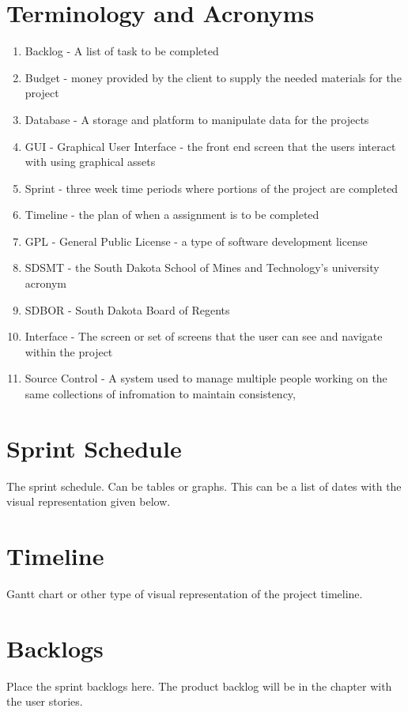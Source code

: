 \section{Terminology and Acronyms}
\begin{enumerate}
\item Backlog - A list of task to be completed
\item Budget - money provided by the client to supply the needed materials for the project
\item Database - A storage and platform to manipulate data for the projects 
\item GUI - Graphical User Interface - the front end screen that the users interact with using graphical assets
\item Sprint - three week time periods where portions of the project are completed
\item Timeline - the plan of when a assignment is to be completed
\item GPL - General Public License - a type of software development license
\item SDSMT - the South Dakota School of Mines and Technology's university acronym
\item SDBOR - South Dakota Board of Regents
\item Interface - The screen or set of screens that the user can see and navigate within the project
\item Source Control - A system used to manage multiple people working on the same collections of infromation to maintain consistency,  
\end{enumerate}

\section{Sprint Schedule}
The sprint schedule.  Can be tables or graphs.   This can be a list of dates with the visual 
representation given below.

\section{Timeline}
Gantt chart or other type of visual representation of the project timeline.

\section{Backlogs}
Place the sprint backlogs here.    The product backlog will be in the chapter with the user 
stories.   


